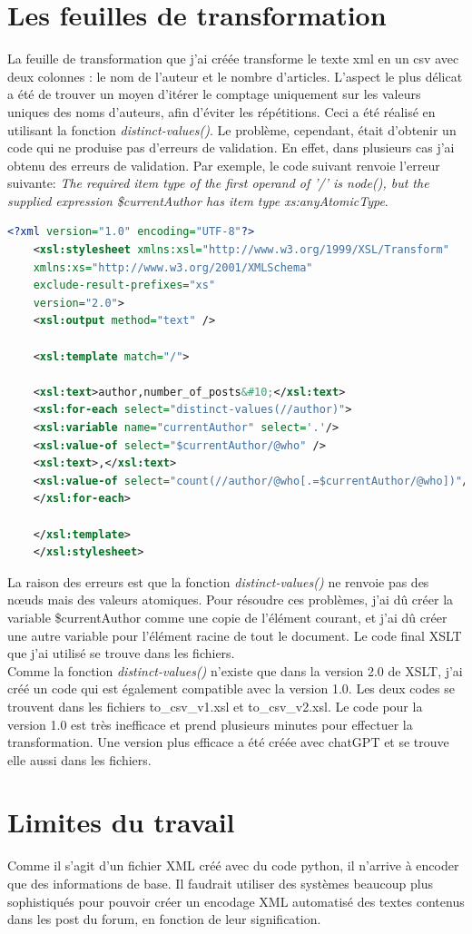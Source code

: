 \documentclass[12pt,a4paper]{article}
\begin{document}
\section{Les feuilles de transformation}
La feuille de transformation que j'ai créée transforme le texte xml en un csv avec deux colonnes : le nom de l'auteur et le nombre d'articles. L'aspect le plus délicat a été de trouver un moyen d'itérer le comptage uniquement sur les valeurs uniques des noms d'auteurs, afin d'éviter les répétitions. Ceci a été réalisé en utilisant la fonction \emph{distinct-values()}.  Le problème, cependant, était d'obtenir un code qui ne produise pas d'erreurs de validation. En effet, dans plusieurs cas j'ai obtenu des erreurs de validation. Par exemple, le code suivant renvoie l'erreur suivante: \emph{The required item type of the first operand of '/' is node(), but the supplied expression {\$currentAuthor} has item type xs:anyAtomicType}.

\begin{lstlisting}[language=XML]
	<?xml version="1.0" encoding="UTF-8"?>
	<xsl:stylesheet xmlns:xsl="http://www.w3.org/1999/XSL/Transform"
	xmlns:xs="http://www.w3.org/2001/XMLSchema"
	exclude-result-prefixes="xs"
	version="2.0">
	<xsl:output method="text" />
	
	<xsl:template match="/">
	
	<xsl:text>author,number_of_posts&#10;</xsl:text>
	<xsl:for-each select="distinct-values(//author)">
	<xsl:variable name="currentAuthor" select='.'/>
	<xsl:value-of select="$currentAuthor/@who" />
	<xsl:text>,</xsl:text>
	<xsl:value-of select="count(//author/@who[.=$currentAuthor/@who])"/>
	</xsl:for-each>
	
	</xsl:template>
	</xsl:stylesheet>
\end{lstlisting}

La raison des erreurs est que la fonction \emph{distinct-values()} ne renvoie pas des nœuds mais des valeurs atomiques. Pour résoudre ces problèmes, j'ai dû créer la variable \$currentAuthor comme une copie de l'élément courant, et j'ai dû créer une autre variable pour l'élément racine de tout le document. Le code final XSLT que j'ai utilisé se trouve dans les fichiers.
\\
Comme la fonction \emph{distinct-values()} n'existe que dans la version 2.0 de XSLT, j'ai créé un code qui est également compatible avec la version 1.0. Les deux codes se trouvent dans les fichiers to\_csv\_v1.xsl et to\_csv\_v2.xsl. Le code pour la version 1.0 est très inefficace et prend plusieurs minutes pour effectuer la transformation. Une version plus efficace a été créée avec chatGPT et se trouve elle aussi dans les fichiers. 

\section{Limites du travail}
Comme il s'agit d'un fichier XML créé avec du code python, il n'arrive à encoder que des informations de base. Il faudrait utiliser des systèmes beaucoup plus sophistiqués pour pouvoir créer un encodage XML automatisé des textes contenus dans les post du forum, en fonction de leur signification.
\end{document}
